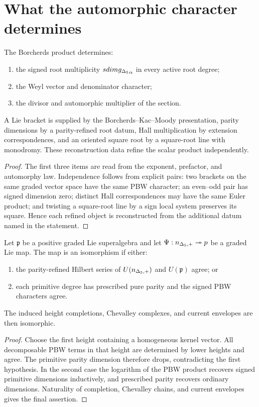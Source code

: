 \chapter{What the automorphic character determines}
\begin{theorem}
The Borcherds product determines:
\begin{enumerate}
\item the signed root multiplicity $sdim{g_{\Delta_5}}_\alpha$ in every active root degree;
\item the Weyl vector and denominator character;
\item the divisor and automorphic multiplier of the section.
\end{enumerate}
A Lie bracket is supplied by the Borcherds--Kac--Moody presentation, parity dimensions by a parity-refined root datum, Hall multiplication by extension correspondences, and an oriented square root by a square-root line with monodromy.  These reconstruction data refine the scalar product independently.
\end{theorem}
\begin{proof}
The first three items are read from the exponent, prefactor, and automorphy law.  Independence follows from explicit pairs: two brackets on the same graded vector space have the same PBW character; an even--odd pair has signed dimension zero; distinct Hall correspondences may have the same Euler product; and twisting a square-root line by a sign local system preserves its square.  Hence each refined object is reconstructed from the additional datum named in the statement.
\end{proof}

\begin{recognition}
Let $\mathfrak p$ be a positive graded Lie superalgebra and let $\Psi:{n_{\Delta_5,+}}\twoheadrightarrow p$ be a graded Lie map.  The map is an isomorphism if either:
\begin{enumerate}
\item the parity-refined Hilbert series of $U({n_{\Delta_5,+}})$ and $U(\mathfrak p)$ agree; or
\item each primitive degree has prescribed pure parity and the signed PBW characters agree.
\end{enumerate}
The induced height completions, Chevalley complexes, and current envelopes are then isomorphic.
\end{recognition}
\begin{proof}
Choose the first height containing a homogeneous kernel vector.  All decomposable PBW terms in that height are determined by lower heights and agree.  The primitive parity dimension therefore drops, contradicting the first hypothesis.  In the second case the logarithm of the PBW product recovers signed primitive dimensions inductively, and prescribed parity recovers ordinary dimensions.  Naturality of completion, Chevalley chains, and current envelopes gives the final assertion.
\end{proof}

